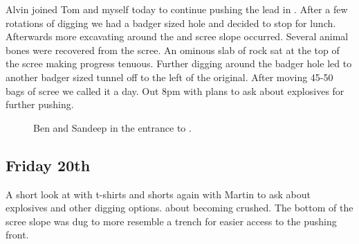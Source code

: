 
Alvin joined Tom and myself today to continue pushing the lead in . After a few rotations of digging we had a badger sized hole and
decided to stop for lunch. Afterwards more excavating around the  and scree slope occurred. Several animal bones were recovered from
the scree. An ominous slab of rock sat at the top of the scree making
progress tenuous. Further digging around the badger hole led to another
badger sized tunnel off to the left of the original. After moving 45-50
bags of scree we called it a day. Out 8pm with plans to ask about
explosives for further pushing.

\begin{figure}[t!]
\checkoddpage \ifoddpage \forcerectofloat \else \forceversofloat \fi
{}
\caption{Ben and Sandeep in the entrance to \protect{}. }
\end{figure}

\subsection{Friday 20th}

A short look at  with t-shirts and shorts again with Martin to ask
about explosives and other digging options.  about becoming crushed. The
bottom of the scree slope was dug to more resemble a trench for easier
access to the pushing front.

